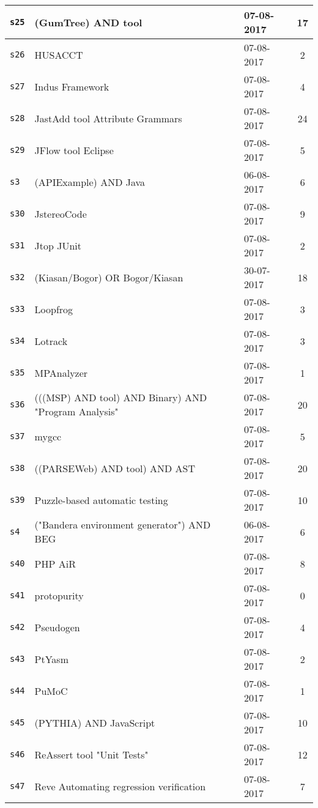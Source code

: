 \begin{longtable}{| l | p{13cm} | l | c |}
    \hline
\texttt{s25} & (GumTree) AND tool & 07-08-2017 & 17 \\
    \hline
\texttt{s26} & HUSACCT & 07-08-2017 & 2 \\
    \hline
\texttt{s27} & Indus Framework & 07-08-2017 & 4 \\
    \hline
\texttt{s28} & JastAdd tool Attribute Grammars & 07-08-2017 & 24 \\
    \hline
\texttt{s29} & JFlow tool Eclipse & 07-08-2017 & 5 \\
    \hline
\texttt{s3} & (APIExample) AND Java & 06-08-2017 & 6 \\
    \hline
\texttt{s30} & JstereoCode & 07-08-2017 & 9 \\
    \hline
\texttt{s31} & Jtop JUnit & 07-08-2017 & 2 \\
    \hline
\texttt{s32} & (Kiasan/Bogor) OR Bogor/Kiasan & 30-07-2017 & 18 \\
    \hline
\texttt{s33} & Loopfrog & 07-08-2017 & 3 \\
    \hline
\texttt{s34} & Lotrack & 07-08-2017 & 3 \\
    \hline
\texttt{s35} & MPAnalyzer & 07-08-2017 & 1 \\
    \hline
\texttt{s36} & (((MSP) AND tool) AND Binary) AND "Program Analysis" & 07-08-2017 & 20 \\
    \hline
\texttt{s37} & mygcc & 07-08-2017 & 5 \\
    \hline
\texttt{s38} & ((PARSEWeb) AND tool) AND AST & 07-08-2017 & 20 \\
    \hline
\texttt{s39} & Puzzle-based automatic testing & 07-08-2017 & 10 \\
    \hline
\texttt{s4} & ("Bandera environment generator") AND BEG & 06-08-2017 & 6 \\
    \hline
\texttt{s40} & PHP AiR & 07-08-2017 & 8 \\
    \hline
\texttt{s41} & protopurity & 07-08-2017 & 0 \\
    \hline
\texttt{s42} & Pseudogen & 07-08-2017 & 4 \\
    \hline
\texttt{s43} & PtYasm & 07-08-2017 & 2 \\
    \hline
\texttt{s44} & PuMoC & 07-08-2017 & 1 \\
    \hline
\texttt{s45} & (PYTHIA) AND JavaScript & 07-08-2017 & 10 \\
    \hline
\texttt{s46} & ReAssert tool "Unit Tests" & 07-08-2017 & 12 \\
    \hline
\texttt{s47} & Reve Automating regression verification & 07-08-2017 & 7 \\

\end{longtable}
